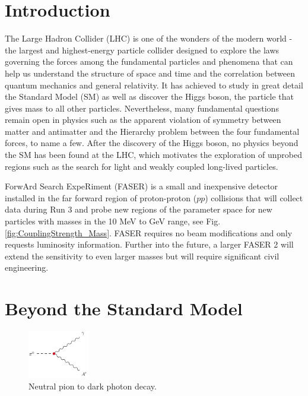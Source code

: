 \section{Introduction} %

The Large Hadron Collider (LHC) is one of the wonders of the modern world - the largest and highest-energy particle collider designed to explore the laws governing the forces among the fundamental particles and phenomena that can help us understand the structure of space and time and the correlation between quantum mechanics and general relativity. It has achieved to study in great detail the Standard Model (SM) as well as discover the Higgs boson, the particle that gives mass to all other particles. Nevertheless, many fundamental questions remain open in physics such as the apparent violation of symmetry between matter and antimatter and the Hierarchy problem between the four fundamental forces, to name a few.
After the discovery of the Higgs boson, no physics beyond the SM has been found at the LHC, which motivates the exploration of unprobed regions such as the search for light and weakly coupled long-lived particles.

ForwArd Search ExpeRiment (FASER) is a small and inexpensive detector installed in the far forward region of proton-proton ($pp$) collisions that will collect data during Run 3 and probe new regions of the parameter space for new particles with masses in the 10 MeV to GeV range, see Fig. \ref{fig:CouplingStrength_Mass}.
FASER requires no beam modifications and only requests luminosity  information. Further into the future, a larger
 FASER 2 will extend the sensitivity to even larger masses but will require significant civil engineering.

\section{Beyond the Standard Model}

\begin{figure}
  \centering
    \includegraphics[width=0.24\textwidth]{DarkPhoton.png} 
    \caption[Neutral Pion Decay]{Neutral pion to dark photon decay.}
    \label{fig:Dark Photon}
\end{figure}

